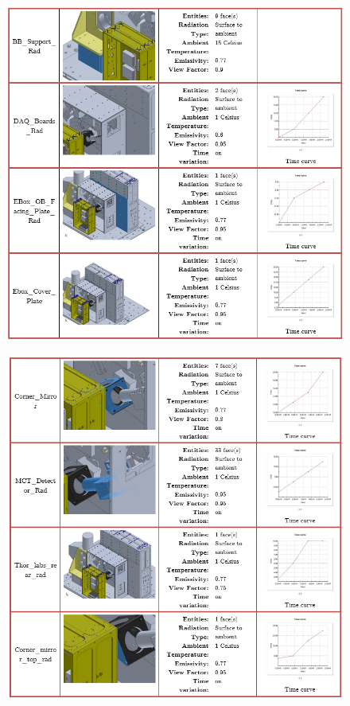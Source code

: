 \begin{figure}
    \centering
    \includegraphics[width=\textwidth]{thermal_load_images/sunrise_TL_images/sunrise_7.PNG}
\end{figure}

\begin{figure}
    \centering
    \includegraphics[width=\textwidth]{thermal_load_images/sunrise_TL_images/sunrise_8.PNG}
\end{figure}

